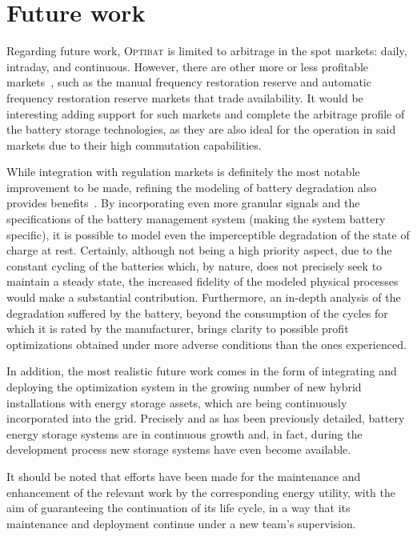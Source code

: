 \section*{Future work}

Regarding future work, \textsc{Optibat} is limited to arbitrage in the spot markets: daily, intraday, and continuous. However, there are other more or less profitable markets~\cite{cnmc2024balance}, such as the manual frequency restoration reserve and automatic frequency restoration reserve markets that trade availability. It would be interesting adding support for such markets and complete the arbitrage profile of the battery storage technologies, as they are also ideal for the operation in said markets due to their high commutation capabilities.

While integration with regulation markets is definitely the most notable improvement to be made, refining the modeling of battery degradation also provides benefits~\cite{shamarova2022review}. By incorporating even more granular signals and the specifications of the battery management system (making the system battery specific), it is possible to model even the imperceptible degradation of the state of charge at rest. Certainly, although not being a high priority aspect, due to the constant cycling of the batteries which, by nature, does not precisely seek to maintain a steady state, the increased fidelity of the modeled physical processes would make a substantial contribution. Furthermore, an in-depth analysis of the degradation suffered by the battery, beyond the consumption of the cycles for which it is rated by the manufacturer, brings clarity to possible profit optimizations obtained under more adverse conditions than the ones experienced.

In addition, the most realistic future work comes in the form of integrating and deploying the optimization system in the growing number of new hybrid installations with energy storage assets, which are being continuously incorporated into the grid. Precisely and as has been previously detailed, battery energy storage systems are in continuous growth and, in fact, during the development process new storage systems have even become available.

It should be noted that efforts have been made for the maintenance and enhancement of the relevant work by the corresponding energy utility, with the aim of guaranteeing the continuation of its life cycle, in a way that its maintenance and deployment continue under a new team's supervision.
